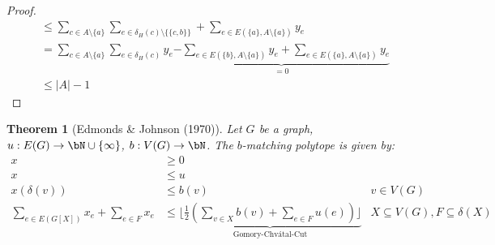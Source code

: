 \documentclass[11pt, a4paper]{article}
\newcommand{\floor}[1]{\lfloor #1 \rfloor}
\newcommand{\abs}[1]{\left\lvert#1\right\rvert}
\newcommand{\set}[1]{\{#1\}}
\newtheorem{theorem}{Theorem}[section]
\theoremstyle{remark}
\theoremstyle{definition}
\begin{document}
\begin{proof}
\begin{align*}
		                        & \leq \sum_{c\in A\setminus\set{a}}\sum_{e\in\delta_H(c)\setminus\set{\set{c,b}}} + \sum_{e\in E(\set{a},A\setminus\set{a})}y_e                                       \\
		                        & =\sum_{c\in A\setminus\set{a}}\sum_{e\in \delta_H(c)}y_e \underbrace{- \sum_{e\in E(\set{b},A\setminus\set{a})}y_e+\sum_{e\in E(\set{a},A\setminus\set{a})}y_e}_{=0} \\
		                        & \leq\abs{A}-1
	\end{align*}
\end{proof}

\begin{theorem}[Edmonds \& Johnson (1970)]
	Let $G$ be a graph, $u: E(G)\to\bN\cup\set{\infty}$, $b: V(G)\to\bN$. The
	$b$-matching polytope is given by:
	\begin{align*}
		x                                       & \geq0                                                                                                                                                    \\
		x                                       & \leq u                                                                                                                                                   \\
		x(\delta(v))                            & \leq b(v)                                                                                                         & v\in V(G)                            \\
		\sum_{e\in E(G[X])}x_e+\sum_{e\in F}x_e & \leq \underbrace{\floor{\frac{1}{2}\left(\sum_{v\in X}b(v)+\sum_{e\in F}u(e)\right)}}_{\text{Gomory-Chvátal-Cut}} & X\subseteq V(G),F\subseteq \delta(X)
	\end{align*}
\end{theorem}
\end{document}
